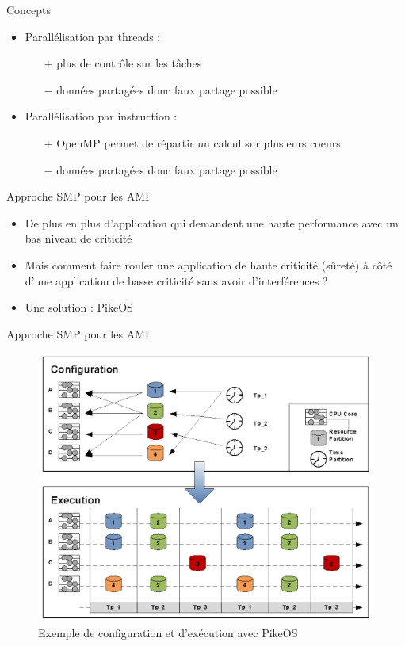 \documentclass{beamer}
\begin{document}
\begin{frame}{Concepts}
	\begin{itemize}
		\item Parallélisation par threads :
			\begin{itemize}
				\item[$+$] plus de contrôle sur les tâches
				\item[$-$] données partagées donc faux partage possible 
			\end{itemize}
		\item Parallélisation par instruction :
			\begin{itemize}
				\item[$+$] OpenMP permet de répartir un calcul sur plusieurs coeurs
				\item[$-$] données partagées donc faux partage possible 
			\end{itemize}
	\end{itemize}
\end{frame}

\begin{frame}{Approche SMP pour les AMI}
	\begin{itemize}
		\item De plus en plus d'application qui demandent une haute performance avec un
			bas niveau de criticité
		\item Mais comment faire rouler une application de haute criticité (sûreté) à côté
			d'une application de basse criticité sans avoir d'interférences ?
		\item Une solution : PikeOS
	\end{itemize}	
\end{frame}

\begin{frame}{Approche SMP pour les AMI}
	\begin{figure}
		\centering
		\includegraphics[height=0.6\paperheight]{pikeos.png}
		\caption{Exemple de configuration et d'exécution avec PikeOS \cite{Fuch}}
		\label{fig:pikeos}
	\end{figure}
\end{frame}
\end{document}
